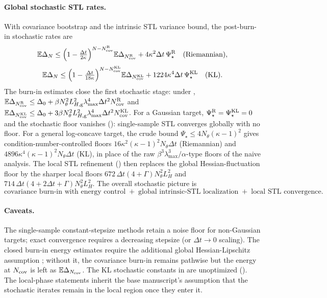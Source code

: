 \paragraph{Global stochastic STL rates.}
With covariance bootstrap and the intrinsic STL variance bound, the post-burn-in stochastic
rates are
\[
    \mathbb{E}\Delta_N
    \leq
    \Bigl(1-\tfrac{\Delta t}{2\kappa}\Bigr)^{N-N_{\mathrm{cov}}^{\mathrm{R}}}\mathbb{E}\Delta_{N_{\mathrm{cov}}^{\mathrm{R}}}
    +4\kappa^2\Delta t\,\Psi_\star^{\mathrm{R}}
    \quad\text{(Riemannian)},
\]
\[
    \mathbb{E}\Delta_N
    \leq
    \Bigl(1-\tfrac{\Delta t}{18\kappa}\Bigr)^{N-N_{\mathrm{cov}}^{\mathrm{KL}}}\mathbb{E}\Delta_{N_{\mathrm{cov}}^{\mathrm{KL}}}
    +1224\kappa^4\Delta t\,\Psi_\star^{\mathrm{KL}}
    \quad\text{(KL)}.
\]
The burn-in estimates close the first stochastic stage: under
, $\mathbb{E}\Delta_{N_{\mathrm{cov}}^{\mathrm{R}}}\leq\Delta_0+\beta N_\theta^2L_{H,\mathrm g}^2\lambda_{\max}^4\Delta t^2N_{\mathrm{cov}}^{\mathrm{R}}$
and $\mathbb{E}\Delta_{N_{\mathrm{cov}}^{\mathrm{KL}}}\leq\Delta_0+3\beta N_\theta^2L_{H,\mathrm g}^2\lambda_{\max}^4\Delta t^2N_{\mathrm{cov}}^{\mathrm{KL}}$.
For a Gaussian target, $\Psi_\star^{\mathrm{R}}=\Psi_\star^{\mathrm{KL}}=0$ and the stochastic floor vanishes
(): single-sample STL converges globally with no floor. For a general
log-concave target, the crude bound $\Psi_\star\leq4N_\theta(\kappa-1)^2$ gives
condition-number-controlled floors $16\kappa^2(\kappa-1)^2N_\theta\Delta t$ (Riemannian) and
$4896\kappa^4(\kappa-1)^2N_\theta\Delta t$ (KL), in place of the raw
$\beta^3\lambda_{\max}^3/\alpha$-type floors of the naive analysis. The local STL refinement
() then replaces the global Hessian-fluctuation floor by the sharper
local floors $672\,\Delta t(4+\Gamma)N_\theta^2L_H^2$ and
$714\,\Delta t(4+2\Delta t+\Gamma)N_\theta^2L_H^2$. The overall stochastic picture is
\[
    \boxed{
    \text{covariance burn-in with energy control}
    \;+\;
    \text{global intrinsic-STL localization}
    \;+\;
    \text{local STL convergence}.
    }
\]

\paragraph{Caveats.}
The single-sample constant-stepsize methods retain a noise floor for non-Gaussian targets;
exact convergence requires a decreasing stepsize (or $\Delta t\to0$ scaling). The closed
burn-in energy estimates require the additional global Hessian-Lipschitz assumption
; without it, the covariance burn-in remains pathwise but the
energy at $N_{\mathrm{cov}}$ is left as $\mathbb{E}\Delta_{N_{\mathrm{cov}}}$. The KL stochastic constants in
 are unoptimized
(). The local-phase statements inherit the base manuscript's
assumption that the stochastic iterates remain in the local region once they enter it.

